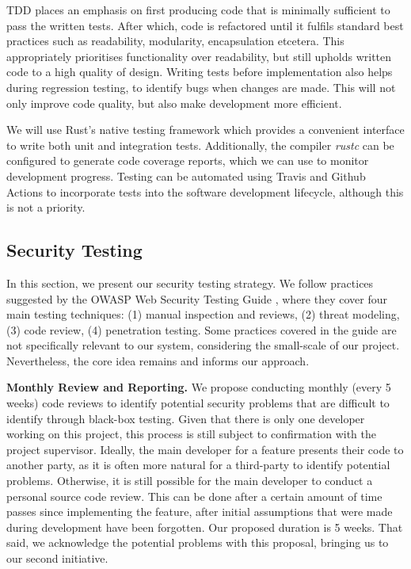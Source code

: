 TDD places an emphasis on first producing code that is minimally sufficient to pass the written tests. After which, code is refactored until it fulfils standard best practices such as readability, modularity, encapsulation etcetera. This appropriately prioritises functionality over readability, but still upholds written code to a high quality of design. Writing tests before implementation also helps during regression testing, to identify bugs when changes are made. This will not only improve code quality, but also make development more efficient. 

We will use Rust's native testing framework which provides a convenient interface to write both unit and integration tests. Additionally, the compiler \textit{rustc} can be configured to generate code coverage reports, which we can use to monitor development progress. Testing can be automated using Travis and Github Actions to incorporate tests into the software development lifecycle, although this is not a priority.

\subsection{Security Testing}
\label{sec:security_testing}
In this section, we present our security testing strategy. We follow practices suggested by the OWASP Web Security Testing Guide \cite{OWASPv4.2}, where they cover four main testing techniques: (1) manual inspection and reviews, (2) threat modeling, (3) code review, (4) penetration testing. Some practices covered in the guide are not specifically relevant to our system, considering the small-scale of our project. Nevertheless, the core idea remains and informs our approach.

\textbf{Monthly Review and Reporting.} We propose conducting monthly (every 5 weeks) code reviews to identify potential security problems that are difficult to identify through black-box testing. Given that there is only one developer working on this project, this process is still subject to confirmation with the project supervisor. Ideally, the main developer for a feature presents their code to another party, as it is often more natural for a third-party to identify potential problems. Otherwise, it is still possible for the main developer to conduct a personal source code review. This can be done after a certain amount of time passes since implementing the feature, after initial assumptions that were made during development have been forgotten. Our proposed duration is 5 weeks. That said, we acknowledge the potential problems with this proposal, bringing us to our second initiative. 

